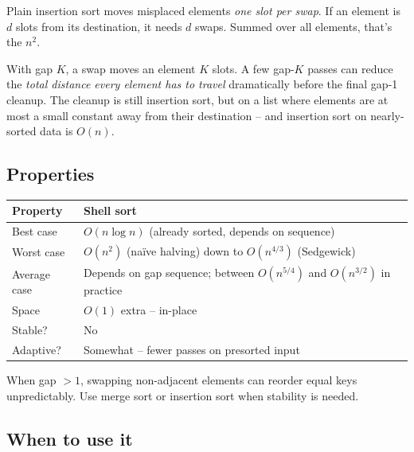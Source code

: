 \documentclass[11pt]{article}
\begin{document}
\begin{ideabox}
Plain insertion sort moves misplaced elements \emph{one slot per
swap}. If an element is $d$ slots from its destination, it needs
$d$ swaps. Summed over all elements, that's the $n^2$.

With gap $K$, a swap moves an element $K$ slots. A few gap-$K$
passes can reduce the \emph{total distance every element has to
travel} dramatically before the final gap-1 cleanup. The cleanup is
still insertion sort, but on a list where elements are at most a
small constant away from their destination -- and insertion sort on
nearly-sorted data is $O(n)$.
\end{ideabox}

\subsection{Properties}

\begin{center}
\footnotesize
\renewcommand{\arraystretch}{1.3}
\begin{tabular}{@{}ll@{}}
\hline
\textbf{Property}            & \textbf{Shell sort} \\
\hline
Best case                    & $O(n \log n)$ (already sorted, depends on sequence) \\
Worst case                   & $O(n^2)$ (na\"ive halving) down to $O(n^{4/3})$ (Sedgewick) \\
Average case                 & Depends on gap sequence; between $O(n^{5/4})$ and $O(n^{3/2})$ in practice \\
Space                        & $O(1)$ extra -- in-place \\
Stable?                      & No \\
Adaptive?                    & Somewhat -- fewer passes on presorted input \\
\hline
\end{tabular}
\end{center}

\begin{warnbox}
When gap $> 1$, swapping non-adjacent elements can reorder equal
keys unpredictably. Use merge sort or insertion sort when stability
is needed.
\end{warnbox}

\subsection{When to use it}
\end{document}
